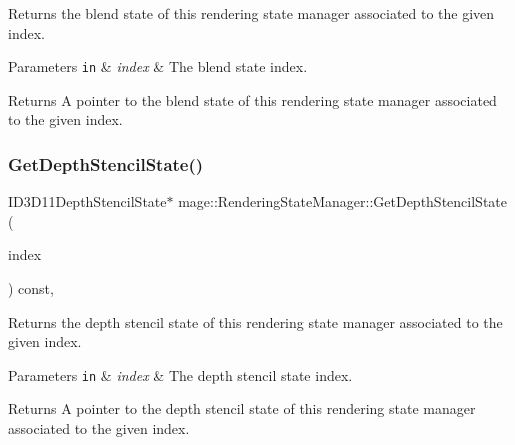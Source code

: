 Returns the blend state of this rendering state manager associated to the given index.


\begin{DoxyParams}[1]{Parameters}
\mbox{\tt in}  & {\em index} & The blend state index. \\
\hline
\end{DoxyParams}
\begin{DoxyReturn}{Returns}
A pointer to the blend state of this rendering state manager associated to the given index. 
\end{DoxyReturn}
\hypertarget{classmage_1_1_rendering_state_manager_aabd3a4bec099f0325c238bdfa43cbc88}{}\label{classmage_1_1_rendering_state_manager_aabd3a4bec099f0325c238bdfa43cbc88} 
\subsubsection{\texorpdfstring{Get\+Depth\+Stencil\+State()}{GetDepthStencilState()}}
{\footnotesize\ttfamily I\+D3\+D11\+Depth\+Stencil\+State$\ast$ mage\+::\+Rendering\+State\+Manager\+::\+Get\+Depth\+Stencil\+State (\begin{DoxyParamCaption}\item[{\hyperlink{classmage_1_1_rendering_state_manager_a7a8ab9ab2d4eb992a364d09c9eec636a}{Depth\+Stencil\+State\+Index}}]{index }\end{DoxyParamCaption}) const\hspace{0.3cm}{\ttfamily [private]}, {\ttfamily [noexcept]}}

Returns the depth stencil state of this rendering state manager associated to the given index.


\begin{DoxyParams}[1]{Parameters}
\mbox{\tt in}  & {\em index} & The depth stencil state index. \\
\hline
\end{DoxyParams}
\begin{DoxyReturn}{Returns}
A pointer to the depth stencil state of this rendering state manager associated to the given index. 
\end{DoxyReturn}
\hypertarget{classmage_1_1_rendering_state_manager_a193a9a4f29256fd8aab7585eb9f810ed}{}\label{classmage_1_1_rendering_state_manager_a193a9a4f29256fd8aab7585eb9f810ed} 
